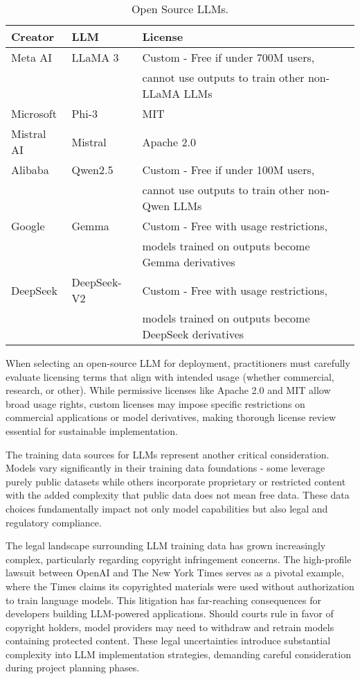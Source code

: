 \begin{table}[H]
\centering
\caption{Open Source LLMs.}
\label{tab:open_source_llms}
\begin{tabular}{p{2cm}p{2cm}p{8cm}}
\hline
Creator & LLM & License \\
\hline
Meta AI & LLaMA 3 & Custom - Free if under 700M users,\\
& & cannot use outputs to train other non-LLaMA LLMs \\
Microsoft & Phi-3 & MIT \\
Mistral AI & Mistral & Apache 2.0 \\
Alibaba & Qwen2.5 & Custom - Free if under 100M users,\\
& & cannot use outputs to train other non-Qwen LLMs \\
Google & Gemma & Custom - Free with usage restrictions,\\
& & models trained on outputs become Gemma derivatives \\
DeepSeek & DeepSeek-V2 & Custom - Free with usage restrictions,\\
& & models trained on outputs become DeepSeek derivatives \\
\hline
\end{tabular}
\end{table}

When selecting an open-source LLM for deployment, practitioners must carefully evaluate licensing terms that align with intended usage (whether commercial, research, or other). While permissive licenses like Apache 2.0 and MIT allow broad usage rights, custom licenses may impose specific restrictions on commercial applications or model derivatives, making thorough license review essential for sustainable implementation.

The training data sources for LLMs represent another critical consideration. Models vary significantly in their training data foundations - some leverage purely public datasets while others incorporate proprietary or restricted content with the added complexity that public data does not mean free data. These data choices fundamentally impact not only model capabilities but also legal and regulatory compliance.

The legal landscape surrounding LLM training data has grown increasingly complex, particularly regarding copyright infringement concerns. The high-profile lawsuit between OpenAI and The New York Times  serves as a pivotal example, where the Times claims its copyrighted materials were used without authorization to train language models. This litigation has far-reaching consequences for developers building LLM-powered applications. Should courts rule in favor of copyright holders, model providers may need to withdraw and retrain models containing protected content. These legal uncertainties introduce substantial complexity into LLM implementation strategies, demanding careful consideration during project planning phases.

